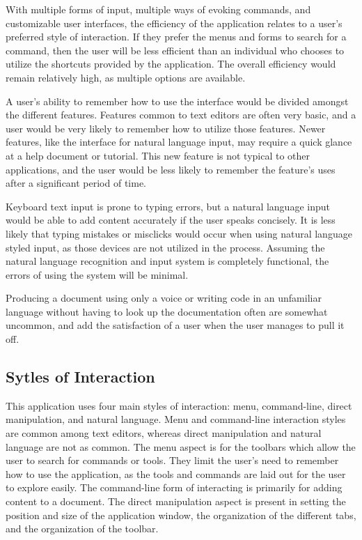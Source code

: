 \documentclass[11pt, oneside]{article}
\begin{document}
With multiple forms of input, multiple ways of evoking commands, and customizable user interfaces, the efficiency of the application relates to a user's preferred style of interaction. If they prefer the menus and forms to search for a command, then the user will be less efficient than an individual who chooses to utilize the shortcuts provided by the application. The overall efficiency would remain relatively high, as multiple options are available.

A user's ability to remember how to use the interface would be divided amongst the different features. Features common to text editors are often very basic, and a user would be very likely to remember how to utilize those features. Newer features, like the interface for natural language input, may require a quick glance at a help document or tutorial. This new feature is not typical to other applications, and the user would be less likely to remember the feature's uses after a significant period of time.

Keyboard text input is prone to typing errors, but a natural language input would be able to add content accurately if the user speaks concisely. It is less likely that typing mistakes or misclicks would occur when using natural language styled input, as those devices are not utilized in the process. Assuming the natural language recognition and input system is completely functional, the errors of using the system will be minimal.

Producing a document using only a voice or writing code in an unfamiliar language without having to look up the documentation often are somewhat uncommon, and add the satisfaction of a user when the user manages to pull it off. 

\subsection{Sytles of Interaction}
This application uses four main styles of interaction: menu, command-line, direct manipulation, and natural language. Menu and command-line interaction styles are common among text editors, whereas direct manipulation and natural language are not as common. The menu aspect is for the toolbars which allow the user to search for commands or tools. They limit the user's need to remember how to use the application, as the tools and commands are laid out for the user to explore easily. The command-line form of interacting is primarily for adding content to a document. The direct manipulation aspect is present in setting the position and size of the application window, the organization of the different tabs, and the organization of the toolbar. 
\end{document}
